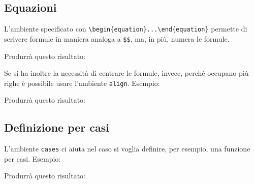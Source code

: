 \subsection{Equazioni}
L'ambiente specificato con \verb!\begin{equation}...\end{equation}! permette 
di scrivere formule in maniera analoga a \verb!$$!, ma, in più, numera le 
formule.

Produrrà questo risultato:\\

\par
Se si ha inoltre la necessità di centrare le formule, invece, perché occupano 
più righe è possibile usare l'ambiente \verb!align!. Esempio:

Produrrà questo risultato:\\


\subsection{Definizione per casi}
L'ambiente \verb!cases! ci aiuta nel caso si voglia definire, per esempio, una 
funzione per casi. Esempio:

Produrrà questo risultato:\\

